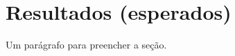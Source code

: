 \section{Resultados (esperados)}
\label{sec:resultados}

Um parágrafo para preencher a seção. {\color{blue}\lipsum[1]}